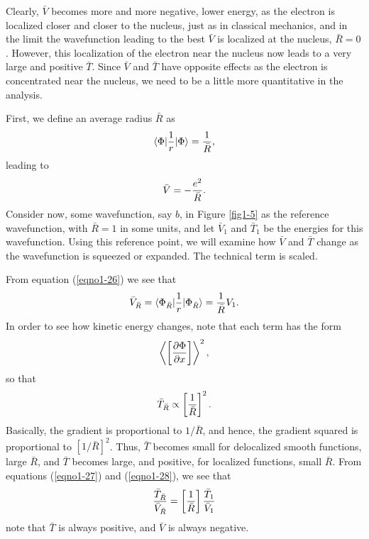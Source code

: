 Clearly, ${\bar V}$ becomes more and more negative, lower energy, as
the electron is localized closer and closer to the nucleus, just as in
classical mechanics, and in the limit the wavefunction leading to the
best ${\bar V}$ is localized at the nucleus, ${\bar R} = 0$. However,
this localization of the electron near the nucleus now leads to a very
large and positive ${\bar T}$. Since ${\bar V}$ and ${\bar T}$ have
opposite effects as the electron is concentrated near the nucleus, we
need to be a little more quantitative in the analysis.

First, we define an average radius ${\bar R}$ as
\begin{equation}
\langle \Phi \vert {1 \over r} \vert \Phi \rangle = {1 \over \bar{R}},
\end{equation}
leading to
\begin{equation}
{\bar V} = - {e^2 \over \bar{R}}.
\label{eqno1-26}
\end{equation}
Consider now, some wavefunction, say $b$, in Figure \ref{fig1-5} as
the reference wavefunction, with ${\bar R} = 1$ in some units, and let
${\bar V}_1$ and ${\bar T}_1$ be the energies for this wavefunction.
Using this reference point, we will examine how ${\bar V}$ and ${\bar
T}$ change as the wavefunction is squeezed or expanded. The technical
term is scaled.

From equation (\ref{eqno1-26}) we see that
\begin{equation}
{\bar V}_{{\bar R}} = \langle \Phi_{{\bar R}} \vert {1 \over r} \vert 
\Phi_{{\bar R}} \rangle = {1 \over {\bar R}} V_1.
\label{eqno1-27}
\end{equation}
In order to see how kinetic energy changes, note that each term has the form
\begin{equation}
\left\langle \left[ {\partial \Phi \over \partial x} \right]\right\rangle^2 ,
\end{equation}
so that
\begin{equation}
{\bar T}_{\bar R} \propto  \left[ {1 \over {\bar R}} \right]^2.
\label{eqno1-28}
\end{equation}
Basically, the gradient is proportional to $1/ {\bar R}$, and hence,
the gradient squared is proportional to $[1/{\bar R}]^2$. Thus, ${\bar
T}$ becomes small for delocalized smooth functions, large ${\bar R}$,
and ${\bar T}$ becomes large, and positive, for localized functions,
small ${\bar R}$.  From equations (\ref{eqno1-27}) and
(\ref{eqno1-28}), we see that
\begin{equation}
{{\bar T}_{\bar R} \over {\bar V}_{\bar R}} = \left[ {1 \over {\bar R}} 
\right] {{\bar T}_1 \over {\bar V}_1}
\label{eqno1-29}
\end{equation}
note that ${\bar T}$ is always positive, and ${\bar V}$ is always negative.

